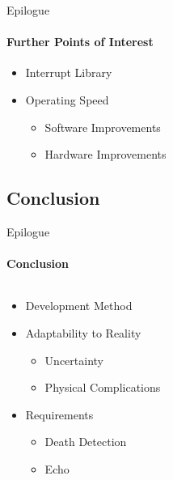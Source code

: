         \begin{frame}[t]{Epilogue}\framesubtitle{Further Points of Interest}
            \begin{itemize}
                \item Interrupt Library
                \item Operating Speed
                    \begin{itemize}
                            \item Software Improvements
                            \item Hardware Improvements
                    \end{itemize}
            \end{itemize}
        \end{frame}

    \subsection{Conclusion}
        \begin{frame}[t]{Epilogue}\framesubtitle{Conclusion}
        \begin{columns}[T]
            \begin{column}{0.48\textwidth}
                \begin{itemize}
                    \item Development Method
                    \item Adaptability to Reality
                        \begin{itemize}
                            \item Uncertainty
                            \item Physical Complications
                        \end{itemize}
                    \item Requirements
                        \begin{itemize}
                            \item Death Detection
                            \item Echo
                        \end{itemize}
                \end{itemize}
            \end{column}
            \begin{column}{.48\textwidth}
                \begin{figure}
                \end{figure}
            \end{column}
        \end{columns}
        \end{frame}

